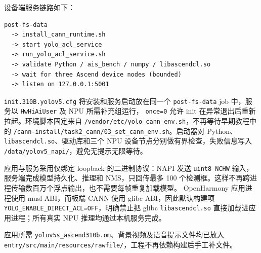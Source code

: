 设备端服务链路如下：

\begin{lstlisting}[caption={镜像内 CANN 推理服务启动链路}]
post-fs-data
  -> install_cann_runtime.sh
  -> start yolo_acl_service
  -> run_yolo_acl_service.sh
  -> validate Python / ais_bench / numpy / libascendcl.so
  -> wait for three Ascend device nodes (bounded)
  -> listen on 127.0.0.1:5001
\end{lstlisting}

\texttt{init.310B.yolov5.cfg} 将安装和服务启动放在同一个
\texttt{post-fs-data} job 中，服务以 \texttt{HwHiAiUser} 及 NPU 所需补充组运行，
\texttt{once=0} 允许 init 在异常退出后重新拉起。环境脚本固定来自
\texttt{/vendor/etc/yolo\_cann\_env.sh}，不再等待早期教程中的
\texttt{/cann-install/task2\_cann/03\_set\_cann\_env.sh}。启动器对 Python、
\texttt{libascendcl.so}、驱动库和三个 NPU 设备节点分别做有界检查，失败信息写入
\texttt{/data/yolov5\_napi/}，避免无提示无限等待。

应用与服务采用仅绑定 loopback 的二进制协议：NAPI 发送
\texttt{uint8 NCHW} 输入，服务端完成模型持久化、推理和 NMS，只回传最多
100 个检测框。这样不再跨进程传输数百万个浮点输出，也不需要每帧重复加载模型。
OpenHarmony 应用进程使用 musl ABI，而板端 CANN 使用 glibc ABI，因此默认构建项
\texttt{YOLO\_ENABLE\_DIRECT\_ACL=OFF}，明确禁止把 glibc
\texttt{libascendcl.so} 直接加载进应用进程；所有真实 NPU 推理均通过本机服务完成。

应用所需 \texttt{yolov5s\_ascend310b.om}、背景视频及语音提示文件均已放入
\texttt{entry/src/main/resources/rawfile/}，工程不再依赖构建后手工补文件。
